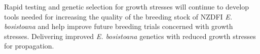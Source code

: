 Rapid testing and genetic selection for growth stresses will continue to develop
tools needed for increasing the quality of the breeding stock of NZDFI
\textit{E. bosistoana} and help improve future breeding trials concerned with
growth stresses. Delivering improved \textit{E. bosistoana} genetics with
reduced growth stresses for propagation.